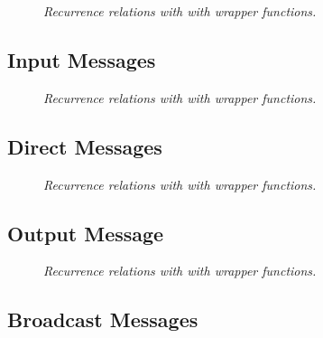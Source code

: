 \documentclass{article}
\begin{document}
\begin{figure}[H]
	\centering
	
	\caption{\it Recurrence relations with with wrapper functions.}
	\label{fig:RRhc}
\end{figure} 



\subsection{Input Messages}

\begin{figure}[H]
	\centering
	
	\caption{\it Recurrence relations with with wrapper functions.}
	\label{fig:RRim}
\end{figure} 


\subsection{Direct Messages}

\begin{figure}[H]
	\centering
	
	\caption{\it Recurrence relations with with wrapper functions.}
	\label{fig:RRdm}
\end{figure} 


\subsection{Output Message}


\begin{figure}[H]
	\centering
	
	\caption{\it Recurrence relations with with wrapper functions.}
	\label{fig:RRom}
\end{figure} 


\subsection{Broadcast Messages}


\end{document}
